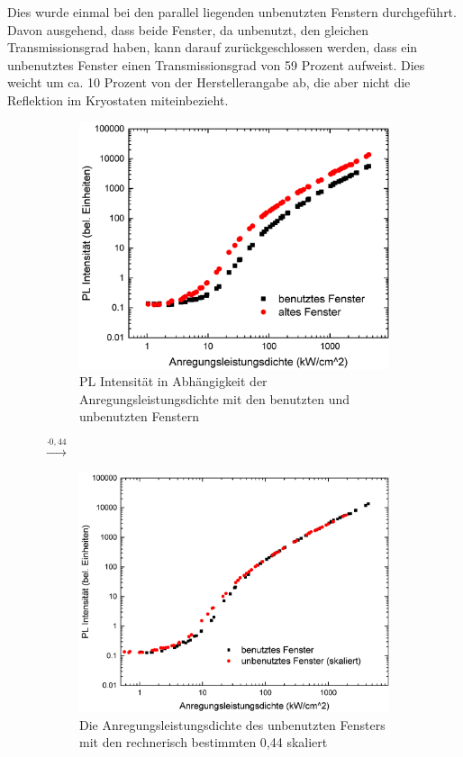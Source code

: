 \newline
Dies wurde einmal bei den parallel liegenden unbenutzten Fenstern durchgeführt. Davon ausgehend, dass beide Fenster, da unbenutzt, den gleichen Transmissionsgrad haben, kann darauf zurückgeschlossen werden, dass ein unbenutztes Fenster einen Transmissionsgrad von 59 Prozent aufweist. Dies weicht um ca. 10 Prozent von der Herstellerangabe ab, die aber nicht die Reflektion im Kryostaten miteinbezieht. 
%
\begin{figure}[htb]
  \centering
  \begin{subfigure}{0.40\textwidth}
    \centering
    \includegraphics[width=0.9\linewidth]{Bilder/uvsilicavergleich.pdf}
    \caption{PL Intensität in Abhängigkeit der Anregungsleistungsdichte mit den benutzten und unbenutzten Fenstern}
    \label{fig:sub1}
  \end{subfigure}%
  {\LARGE$\xrightarrow{\cdot 0,44}$}
  \begin{subfigure}{0.40\textwidth}
    \centering
    \includegraphics[width=0.9\linewidth]{Bilder/uvsilicaVergleichSkaliert.pdf}
    \caption{Die Anregungsleistungsdichte des unbenutzten Fensters mit den rechnerisch bestimmten 0,44 skaliert}
    \label{fig:sub2}
  \end{subfigure}
  \caption{}
  \label{fig:vergleichSkaliert}
\end{figure}

